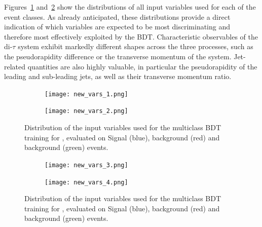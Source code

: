 Figures~\ref{tth_vars_tmva_1} and~\ref{tth_vars_tmva_2} show the distributions of all input variables used for each of the event classes. As already anticipated, these distributions provide a direct indication of which variables are expected to be most discriminating and therefore most effectively exploited by the BDT. Characteristic observables of the di-$\tau$ system exhibit markedly different shapes across the three processes, such as the pseudorapidity difference or the transverse momentum of the system. Jet-related quantities are also highly valuable, in particular the pseudorapidity of the leading and sub-leading jets, as well as their transverse momentum ratio.

\begin{figure}[htbp]
    \centering
    \begin{subfigure}{0.95\linewidth}
      \centering
      \texttt{[image: new\_vars\_1.png]}
    \end{subfigure}
    \vspace{0.5cm} %
    \begin{subfigure}{0.95\linewidth}
      \centering
      \texttt{[image: new\_vars\_2.png]}
    \end{subfigure}
    \caption{Distribution of the input variables used for the multiclass BDT training for \ttHtt, evaluated on Signal (blue), \ztautau background (red) and \ttbar background (green) events.}
    \label{tth_vars_tmva_1}
  \end{figure}

  \begin{figure}[htbp]
    \centering
    \begin{subfigure}{0.95\linewidth}
      \centering
      \texttt{[image: new\_vars\_3.png]}
    \end{subfigure}
    \vspace{0.5cm} %
    \begin{subfigure}{0.95\linewidth}
      \centering
      \texttt{[image: new\_vars\_4.png]}
    \end{subfigure}
    \caption{Distribution of the input variables used for the multiclass BDT training for \ttHtt, evaluated on Signal (blue), \ztautau background (red) and \ttbar background (green) events.}
    \label{tth_vars_tmva_2}
  \end{figure}


